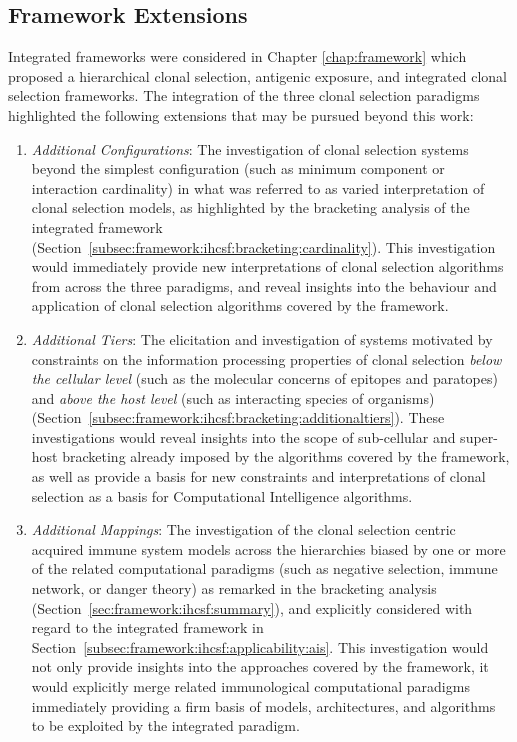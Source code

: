 %
%
\subsection{Framework Extensions}
Integrated frameworks were considered in Chapter \ref{chap:framework} which proposed a hierarchical clonal selection, antigenic exposure, and integrated clonal selection frameworks. The integration of the three clonal selection paradigms highlighted the following extensions that may be pursued beyond this work:

\begin{enumerate}
	\item \emph{Additional Configurations}: The investigation of clonal selection systems beyond the simplest configuration (such as minimum component or interaction cardinality) in what was referred to as varied interpretation of clonal selection models, as highlighted by the bracketing analysis of the integrated framework (Section~\ref{subsec:framework:ihcsf:bracketing:cardinality}). This investigation would immediately provide new interpretations of clonal selection algorithms from across the three paradigms, and reveal insights into the behaviour and application of clonal selection algorithms covered by the framework.
	\item \emph{Additional Tiers}: The elicitation and investigation of systems motivated by constraints on the information processing properties of clonal selection \emph{below the cellular level} (such as the molecular concerns of epitopes and paratopes) and \emph{above the host level} (such as interacting species of organisms) (Section~\ref{subsec:framework:ihcsf:bracketing:additionaltiers}). These investigations would reveal insights into the scope of sub-cellular and super-host bracketing already imposed by the algorithms covered by the framework, as well as provide a basis for new constraints and interpretations of clonal selection as a basis for Computational Intelligence algorithms.
	\item \emph{Additional Mappings}: The investigation of the clonal selection centric acquired immune system models across the hierarchies biased by one or more of the related computational paradigms (such as negative selection, immune network, or danger theory) as remarked in the bracketing analysis (Section~\ref{sec:framework:ihcsf:summary}), and explicitly considered with regard to the integrated framework in Section~\ref{subsec:framework:ihcsf:applicability:ais}. This investigation would not only provide insights into the approaches covered by the framework, it would explicitly merge related immunological computational paradigms immediately providing a firm basis of models, architectures, and algorithms to be exploited by the integrated paradigm.
\end{enumerate}

